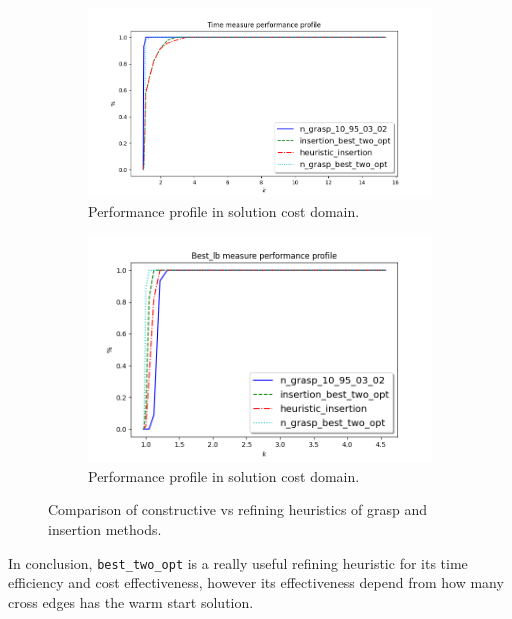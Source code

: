 \begin{figure}
\centering
\begin{subfigure}{.7\textwidth}
	\centering
	\includegraphics[width=\columnwidth]{../res/Lgrasp_insertion_refining_LA_time.png}
	\caption{Performance profile in solution cost domain.}
	\label{fig:Lgrasp_insertion_refining_LA_time}
\end{subfigure}
\begin{subfigure}{.7\textwidth}
	\centering
	\includegraphics[width=\columnwidth]{../res/Lgrasp_insertion_refining_LA_lb.png}
	\caption{Performance profile in solution cost domain.}
	\label{fig:Lgrasp_insertion_refining_LA_lb}
\end{subfigure}
\caption{Comparison of constructive vs refining heuristics of grasp and insertion methods.}
\label{fig:pp_Lgrasp_insertion_refining}
\end{figure}

In conclusion, \texttt{best\_two\_opt} is a really useful refining heuristic for its time efficiency and cost effectiveness, however its effectiveness depend from how many cross edges has the warm start solution.
